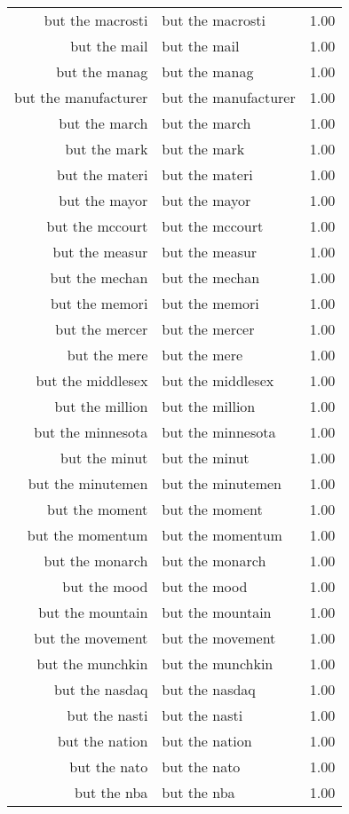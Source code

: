 \begin{table}[ht]
\begin{tabular}{rlr}
  but the macrosti & but the macrosti & 1.00 \\ 
  but the mail & but the mail & 1.00 \\ 
  but the manag & but the manag & 1.00 \\ 
  but the manufacturer & but the manufacturer & 1.00 \\ 
  but the march & but the march & 1.00 \\ 
  but the mark & but the mark & 1.00 \\ 
  but the materi & but the materi & 1.00 \\ 
  but the mayor & but the mayor & 1.00 \\ 
  but the mccourt & but the mccourt & 1.00 \\ 
  but the measur & but the measur & 1.00 \\ 
  but the mechan & but the mechan & 1.00 \\ 
  but the memori & but the memori & 1.00 \\ 
  but the mercer & but the mercer & 1.00 \\ 
  but the mere & but the mere & 1.00 \\ 
  but the middlesex & but the middlesex & 1.00 \\ 
  but the million & but the million & 1.00 \\ 
  but the minnesota & but the minnesota & 1.00 \\ 
  but the minut & but the minut & 1.00 \\ 
  but the minutemen & but the minutemen & 1.00 \\ 
  but the moment & but the moment & 1.00 \\ 
  but the momentum & but the momentum & 1.00 \\ 
  but the monarch & but the monarch & 1.00 \\ 
  but the mood & but the mood & 1.00 \\ 
  but the mountain & but the mountain & 1.00 \\ 
  but the movement & but the movement & 1.00 \\ 
  but the munchkin & but the munchkin & 1.00 \\ 
  but the nasdaq & but the nasdaq & 1.00 \\ 
  but the nasti & but the nasti & 1.00 \\ 
  but the nation & but the nation & 1.00 \\ 
  but the nato & but the nato & 1.00 \\ 
  but the nba & but the nba & 1.00 \\ 

\end{tabular}
\end{table}

